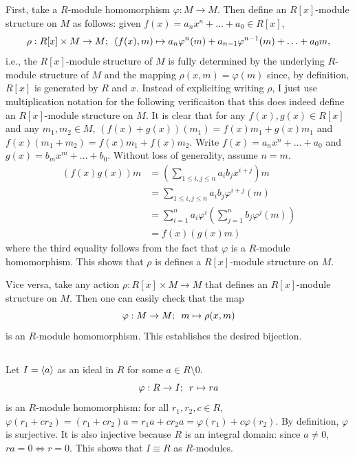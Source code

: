 \documentclass[12pt]{article}
\begin{document}
\subsection{}
First, take a $R$-module homomorphism $\varphi:M \rightarrow M$. 
Then define an $R[x]$-module structure on $M$ as follows:
given $f(x) = a_n x^n + \ldots + a_0 \in R[x]$, 
$$\rho: R[x] \times M \rightarrow M; \hspace{0.5em} (f(x), m) \mapsto a_n \varphi^{n}(m) + a_{n - 1} \varphi^{n - 1}(m) + \ldots + a_0 m,$$ 
i.e., the $R[x]$-module structure of $M$ is fully determined by the underlying $R$-module structure of $M$ and the mapping $\rho(x, m) = \varphi(m)$ since, by definition, $R[x]$ is generated by $R$ and $x$. 
Instead of expliciting writing $\rho$, I just use multiplication notation for the following verificaiton that this does indeed define an $R[x]$-module structure on $M$. 
It is clear that for any $f(x), g(x) \in R[x]$ and any $m_1, m_2 \in M$, $(f(x) + g(x))(m_1) = f(x)m_1 + g(x)m_1$ and $f(x)(m_1 + m_2) = f(x)m_1 + f(x)m_2$. 
Write $f(x) = a_n x^n + \ldots + a_0$ and $g(x) = b_m x^m + \ldots + b_0$. 
Without loss of generality, assume $n = m$. 
\begin{align*}
  (f(x)g(x))m & = \left(\sum_{1 \leq i, j \leq n} a_i b_j x^{i + j}\right) m \\ 
              & = \sum_{1 \leq i, j \leq n}a_i b_j \varphi^{i + j}(m) \\ 
              & = \sum_{i = 1}^{n} a_i \varphi^{i} \left(\sum_{j = 1}^{n} b_j \varphi^{j}(m)\right) \\ 
              & = f(x) (g(x)m)
\end{align*}
where the third equality follows from the fact that $\varphi$ is a $R$-module homomorphism.
This shows that $\rho$ is defines a $R[x]$-module structure on $M$. 

Vice versa, take any action $\rho: R[x] \times M \rightarrow M$ that defines an $R[x]$-module structure on $M$. 
Then one can easily check that the map
$$\varphi: M \rightarrow M; \hspace{0.5em} m \mapsto \rho(x, m)$$
is an $R$-module homomorphism. 
This establishes the desired bijection. 

\setcounter{subsection}{12} 
\subsection{}
Let $I = \langle a\rangle$ as an ideal in $R$ for some $a \in R \setminus 0$. 
$$\varphi: R \rightarrow I; \hspace{0.5em} r \mapsto ra$$ 
is an $R$-module homomorphism: 
for all $r_1, r_2, c \in R$, $\varphi(r_1 + cr_2) = (r_1 + cr_2)a = r_1a + cr_2a = \varphi(r_1) + c\varphi(r_2)$. 
By definition, $\varphi$ is surjective. 
It is also injective because $R$ is an integral domain: 
since $a \neq 0$, $ra = 0 \iff r = 0$. 
This shows that $I \equiv R$ as $R$-modules.
\end{document}
